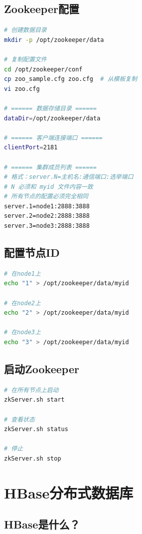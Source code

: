 \documentclass[12pt,a4paper]{article}
\begin{document}
\subsection{Zookeeper配置}

\begin{lstlisting}[language=bash]
# 创建数据目录
mkdir -p /opt/zookeeper/data

# 复制配置文件
cd /opt/zookeeper/conf
cp zoo_sample.cfg zoo.cfg  # 从模板复制
vi zoo.cfg

# ====== 数据存储目录 ======
dataDir=/opt/zookeeper/data

# ====== 客户端连接端口 ======
clientPort=2181

# ====== 集群成员列表 ======
# 格式：server.N=主机名:通信端口:选举端口
# N 必须和 myid 文件内容一致
# 所有节点的配置必须完全相同
server.1=node1:2888:3888
server.2=node2:2888:3888
server.3=node3:2888:3888
\end{lstlisting}

\subsection{配置节点ID}

\begin{lstlisting}[language=bash]
# 在node1上
echo "1" > /opt/zookeeper/data/myid

# 在node2上
echo "2" > /opt/zookeeper/data/myid

# 在node3上
echo "3" > /opt/zookeeper/data/myid
\end{lstlisting}

\subsection{启动Zookeeper}

\begin{lstlisting}[language=bash]
# 在所有节点上启动
zkServer.sh start

# 查看状态
zkServer.sh status

# 停止
zkServer.sh stop
\end{lstlisting}

\section{HBase分布式数据库}

\subsection{HBase是什么？}
\end{document}
